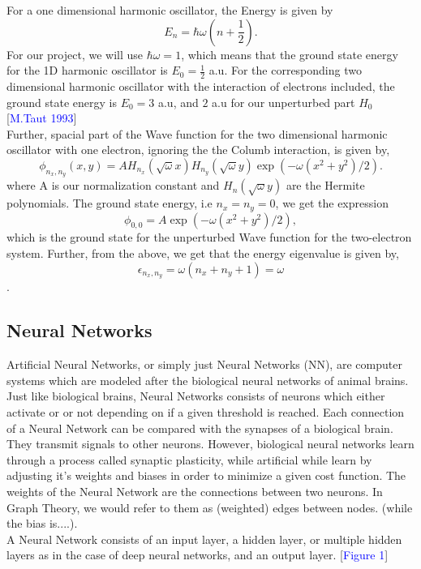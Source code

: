 For a one dimensional harmonic oscillator, the Energy is given by
\begin{equation*}
    E_n = \hbar \omega (n + \frac{1}{2}).
\end{equation*}
For our project, we will use $\hbar \omega = 1$, which means that the ground state energy for the 1D harmonic oscillator is $E_0  = \frac{1}{2}$ a.u. For the corresponding two dimensional harmonic oscillator with the interaction of electrons included, the ground state energy is $E_0 = 3$ a.u, and $2$ a.u for our unperturbed part $H_0$  [\textcolor{blue}{M.Taut 1993}] \\
Further, spacial part of the Wave function for the two dimensional harmonic oscillator with one electron, ignoring the the Columb interaction, is given by, \begin{equation*}
\phi_{n_x,n_y}(x,y) = A H_{n_x}(\sqrt{\omega}x)H_{n_y}(\sqrt{\omega}y)\exp{(-\omega(x^2+y^2)/2)}.
\end{equation*}
where A is our normalization constant and $H_{n}(\sqrt{\omega}y)$ are the Hermite polynomials. The ground state energy, i.e $n_x=n_y = 0$, we get the expression
\begin{equation*}
    \phi_{0,0} = A\exp{(-\omega(x^2+y^2)/2)},
\end{equation*}
which is the ground state for the unperturbed Wave function for the two-electron system. Further, from the above, we get that the energy eigenvalue is given by,  $$\epsilon_{n_x,n_y}=\omega(n_x+n_y+1) = \omega$$. \\
\subsection{Neural Networks}
Artificial Neural Networks, or simply just Neural Networks (NN), are computer systems which are modeled after the biological neural networks of animal brains. Just like biological brains, Neural Networks consists of neurons which either activate or or not depending on if a given threshold is reached. Each connection of a Neural Network can be compared with the synapses of a biological brain. They transmit signals to other neurons. However, biological neural networks learn through a process called synaptic plasticity, while artificial while learn by adjusting it's weights and biases in order to minimize a given cost function. The weights of the Neural Network are the connections between two neurons. In Graph Theory, we would refer to them as (weighted) edges between nodes. (while the bias is....). 
\\
A Neural Network consists of an input layer, a hidden layer, or multiple hidden layers as in the case of deep neural networks, and an output layer. [\textcolor{blue}{Figure 1}]

